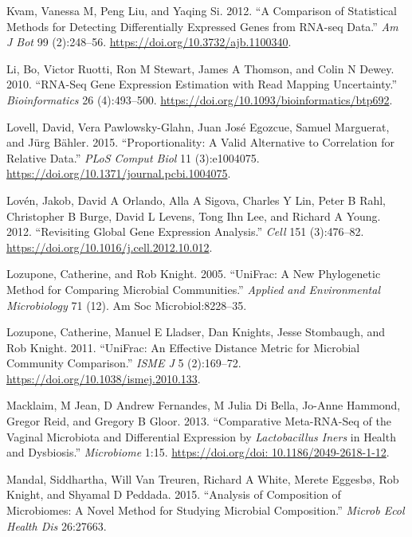 \documentclass[onecolumn]{book}
\theoremstyle{definition}
\theoremstyle{definition}
\theoremstyle{definition}
\theoremstyle{remark}
\begin{document}
\leavevmode\hypertarget{ref-Kvam:2012}{}%
Kvam, Vanessa M, Peng Liu, and Yaqing Si. 2012. ``A Comparison of
Statistical Methods for Detecting Differentially Expressed Genes from
RNA-seq Data.'' \emph{Am J Bot} 99 (2):248--56.
\url{https://doi.org/10.3732/ajb.1100340}.

\leavevmode\hypertarget{ref-Li:2010aa}{}%
Li, Bo, Victor Ruotti, Ron M Stewart, James A Thomson, and Colin N
Dewey. 2010. ``RNA-Seq Gene Expression Estimation with Read Mapping
Uncertainty.'' \emph{Bioinformatics} 26 (4):493--500.
\url{https://doi.org/10.1093/bioinformatics/btp692}.

\leavevmode\hypertarget{ref-Lovell:2015}{}%
Lovell, David, Vera Pawlowsky-Glahn, Juan José Egozcue, Samuel
Marguerat, and Jürg Bähler. 2015. ``Proportionality: A Valid Alternative
to Correlation for Relative Data.'' \emph{PLoS Comput Biol} 11
(3):e1004075. \url{https://doi.org/10.1371/journal.pcbi.1004075}.

\leavevmode\hypertarget{ref-Loven:2012aa}{}%
Lovén, Jakob, David A Orlando, Alla A Sigova, Charles Y Lin, Peter B
Rahl, Christopher B Burge, David L Levens, Tong Ihn Lee, and Richard A
Young. 2012. ``Revisiting Global Gene Expression Analysis.'' \emph{Cell}
151 (3):476--82. \url{https://doi.org/10.1016/j.cell.2012.10.012}.

\leavevmode\hypertarget{ref-unifrac:2005}{}%
Lozupone, Catherine, and Rob Knight. 2005. ``UniFrac: A New Phylogenetic
Method for Comparing Microbial Communities.'' \emph{Applied and
Environmental Microbiology} 71 (12). Am Soc Microbiol:8228--35.

\leavevmode\hypertarget{ref-Lozupone:2011aa}{}%
Lozupone, Catherine, Manuel E Lladser, Dan Knights, Jesse Stombaugh, and
Rob Knight. 2011. ``UniFrac: An Effective Distance Metric for Microbial
Community Comparison.'' \emph{ISME J} 5 (2):169--72.
\url{https://doi.org/10.1038/ismej.2010.133}.

\leavevmode\hypertarget{ref-macklaim:2013}{}%
Macklaim, M Jean, D Andrew Fernandes, M Julia Di Bella, Jo-Anne Hammond,
Gregor Reid, and Gregory B Gloor. 2013. ``Comparative Meta-RNA-Seq of
the Vaginal Microbiota and Differential Expression by
\emph{Lactobacillus Iners} in Health and Dysbiosis.'' \emph{Microbiome}
1:15.
\href{https://doi.org/doi:\%2010.1186/2049-2618-1-12}{https://doi.org/doi: 10.1186/2049-2618-1-12}.

\leavevmode\hypertarget{ref-ancom:2015}{}%
Mandal, Siddhartha, Will Van Treuren, Richard A White, Merete Eggesbø,
Rob Knight, and Shyamal D Peddada. 2015. ``Analysis of Composition of
Microbiomes: A Novel Method for Studying Microbial Composition.''
\emph{Microb Ecol Health Dis} 26:27663.
\end{document}
